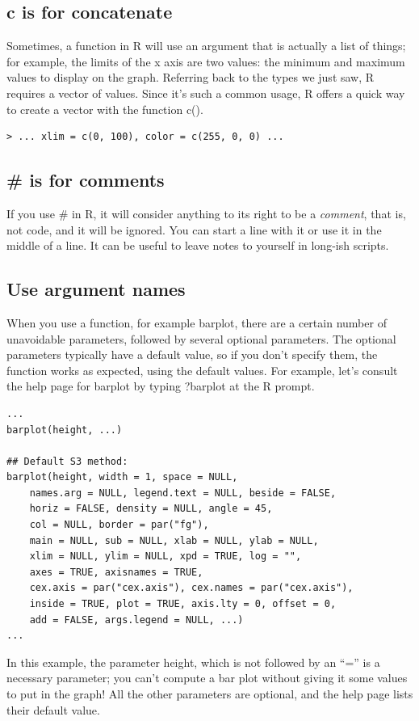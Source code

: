 \documentclass{report}
\newcommand{\code}[1]{\textsf{\ttfamily #1}}
\begin{document}
	\subsection{\code{c} is for concatenate}
	Sometimes, a function in R will use an argument that is actually a list of things; for example, the limits of the x axis are two values: the minimum and maximum values to display on the graph. Referring back to the types we just saw, R requires a \code{vector} of values. Since it's such a common usage, R offers a quick way to create a vector with the function \code{c()}.
	\begin{verbatim}
> ... xlim = c(0, 100), color = c(255, 0, 0) ...
	\end{verbatim}
	
	\subsection{\# is for comments}
	If you use \code{\#} in R, it will consider anything to its right to be a \emph{comment}, that is, not code, and it will be ignored. You can start a line with it or use it in the middle of a line. It can be useful to leave notes to yourself in long-ish scripts.
	
	\subsection{Use argument names}
	When you use a function, for example \code{barplot}, there are a certain number of unavoidable parameters, followed by several optional parameters. The optional parameters typically have a default value, so if you don't specify them, the function works as expected, using the default values. For example, let's consult the help page for \code{barplot} by typing \code{?barplot} at the R prompt.
	\begin{verbatim}
...
barplot(height, ...)

## Default S3 method:
barplot(height, width = 1, space = NULL,
	names.arg = NULL, legend.text = NULL, beside = FALSE,
	horiz = FALSE, density = NULL, angle = 45,
	col = NULL, border = par("fg"),
	main = NULL, sub = NULL, xlab = NULL, ylab = NULL,
	xlim = NULL, ylim = NULL, xpd = TRUE, log = "",
	axes = TRUE, axisnames = TRUE,
	cex.axis = par("cex.axis"), cex.names = par("cex.axis"),
	inside = TRUE, plot = TRUE, axis.lty = 0, offset = 0,
	add = FALSE, args.legend = NULL, ...)
...
	\end{verbatim}
	
	In this example, the parameter \code{height}, which is not followed by an ``='' is a necessary parameter; you can't compute a bar plot without giving it some values to put in the graph! All the other parameters are optional, and the help page lists their default value.
	
\end{document}
